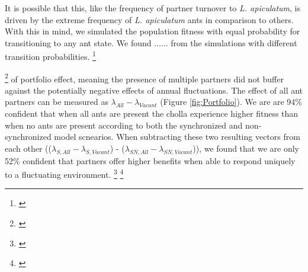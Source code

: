 \documentclass[11pt]{article}
\newcommand{\tom}[2]{{\color{red}{#1}}\footnote{\textit{\color{red}{#2}}}}
\newcommand{\ali}[2]{{\color{blue}{#1}}\footnote{\textit{\color{blue}{#2}}}}
\begin{document}
It is possible that this, like the frequency of partner turnover to \textit{L. apiculatum}, is driven by the extreme frequency of \textit{L. apiculatum} ants in comparison to others. 
With this in mind, we simulated the population fitness with equal probability for transitioning to any ant state.
We found ...... from the simulations with different transition probabilities.
 \ali{}{This feels like the most natural progression to me.}

\tom{We found evidence}{I think this should say ``no evidence''??} of portfolio effect, meaning the presence of multiple partners did not buffer against the potentially negative effects of annual fluctuations.
The effect of all ant partners can be measured as $\lambda_{All} - \lambda_{Vacant}$ (Figure \ref{fig:Portfolio}).
We are are 94\% confident that when all ants are present the cholla experience higher fitness than when no ants are present according to both the synchronized and non-synchronized model scnearios. 
When subtracting these two resulting vectors from each other (($\lambda_{S,All} - \lambda_{S,Vacant}$) - ($\lambda_{SN,All} - \lambda_{SN,Vacant}$)), we found that we are only 52\% confident that partners offer higher benefits when able to respond uniquely to a fluctuating environment. 
\ali{There is no real difference between the two scenarios, meaning we have no evidence of portfolio effect.}{I am not sure if I have explained enough here honestly.}
\tom{}{I agree with your interpretation, but let's come back to editing this after we talk through the best way to look at portfolio effect.}
\end{document}
